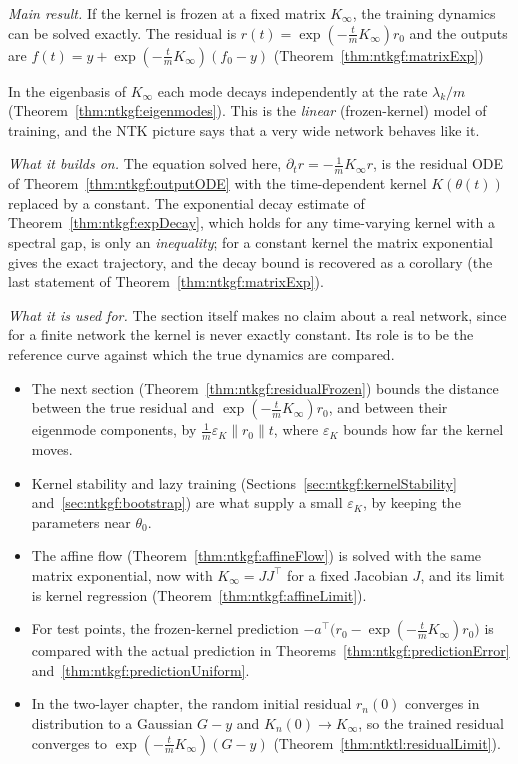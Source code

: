 \begin{remark}\label{rmk:ntkgf:linearRole}
\emph{Main result.} If the kernel is frozen at a fixed matrix $K_\infty$, the training dynamics can be solved exactly. The residual is $r(t)=\exp(-\tfrac tmK_\infty)r_0$ and the outputs are $f(t)=y+\exp(-\tfrac tmK_\infty)(f_0-y)$ (Theorem~\ref{thm:ntkgf:matrixExp})

In the eigenbasis of $K_\infty$ each mode decays independently at the rate $\lambda_k/m$ (Theorem~\ref{thm:ntkgf:eigenmodes}). This is the \emph{linear} (frozen-kernel) model of training, and the NTK picture says that a very wide network behaves like it.

\emph{What it builds on.} The equation solved here, $\partial_tr=-\frac1mK_\infty r$, is the residual ODE of Theorem~\ref{thm:ntkgf:outputODE} with the time-dependent kernel $K(\theta(t))$ replaced by a constant. The exponential decay estimate of Theorem~\ref{thm:ntkgf:expDecay}, which holds for any time-varying kernel with a spectral gap, is only an \emph{inequality}; for a constant kernel the matrix exponential gives the exact trajectory, and the decay bound is recovered as a corollary (the last statement of Theorem~\ref{thm:ntkgf:matrixExp}).

\emph{What it is used for.} The section itself makes no claim about a real network, since for a finite network the kernel is never exactly constant. Its role is to be the reference curve against which the true dynamics are compared.
\begin{itemize}
  \item The next section (Theorem~\ref{thm:ntkgf:residualFrozen}) bounds the distance between the true residual and $\exp(-\frac tmK_\infty)r_0$, and between their eigenmode components, by $\frac1m\varepsilon_K\|r_0\|t$, where $\varepsilon_K$ bounds how far the kernel moves.
  \item Kernel stability and lazy training (Sections~\ref{sec:ntkgf:kernelStability} and~\ref{sec:ntkgf:bootstrap}) are what supply a small $\varepsilon_K$, by keeping the parameters near $\theta_0$.
  \item The affine flow (Theorem~\ref{thm:ntkgf:affineFlow}) is solved with the same matrix exponential, now with $K_\infty=JJ^\top$ for a fixed Jacobian $J$, and its limit is kernel regression (Theorem~\ref{thm:ntkgf:affineLimit}).
  \item For test points, the frozen-kernel prediction $-a^\top\bigl(r_0-\exp(-\frac tmK_\infty)r_0\bigr)$ is compared with the actual prediction in Theorems~\ref{thm:ntkgf:predictionError} and~\ref{thm:ntkgf:predictionUniform}.
  \item In the two-layer chapter, the random initial residual $r_n(0)$ converges in distribution to a Gaussian $G-y$ and $K_n(0)\to K_\infty$, so the trained residual converges to $\exp(-\frac tmK_\infty)(G-y)$ (Theorem~\ref{thm:ntktl:residualLimit}).
\end{itemize}
\end{remark}


